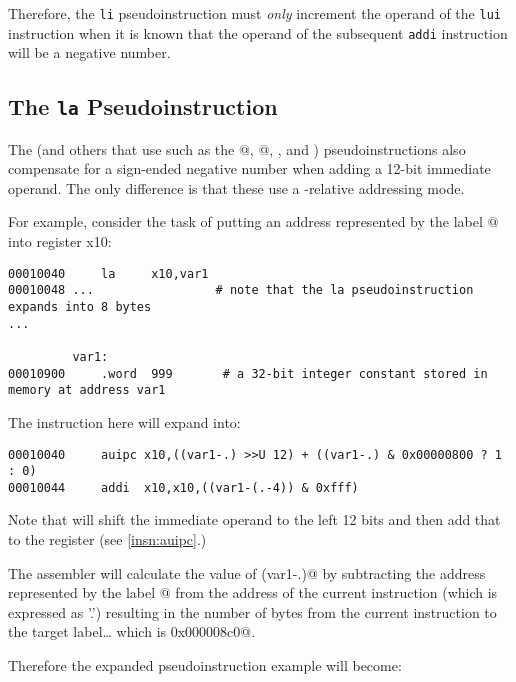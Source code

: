 Therefore, the {\tt li} pseudoinstruction must {\em only} increment the operand of the
{\tt lui} instruction when it is known that the operand of the subsequent {\tt addi} 
instruction will be a negative number.









\subsection{The {\tt la} Pseudoinstruction}

The \verb@la@ (and others that use \verb@auipc@ such as 
the @, @, \verb@call@, and \verb@tail@) pseudoinstructions
also compensate for a sign-ended negative number when adding a 12-bit immediate
operand. The only difference is that these use a \verb@pc@-relative addressing mode.

For example, consider the task of putting an address represented by the label @
into register x10:

{\small
\begin{verbatim}
00010040     la     x10,var1
00010048 ...                 # note that the la pseudoinstruction expands into 8 bytes
...

         var1:
00010900     .word  999       # a 32-bit integer constant stored in memory at address var1
\end{verbatim}
}
The \verb@la@ instruction here will expand into:
{\small
\begin{verbatim}
00010040     auipc x10,((var1-.) >>U 12) + ((var1-.) & 0x00000800 ? 1 : 0)
00010044     addi  x10,x10,((var1-(.-4)) & 0xfff)
\end{verbatim}
}

Note that \verb@auipc@ will shift the immediate operand to the left 12 bits and then
add that to the \verb@pc@ register (see \autoref{insn:auipc}.)

The assembler will calculate the value of \verb@(var1-.)@ by subtracting the address
represented by the label @ from the address of the current instruction 
(which is expressed as '.') resulting in the number of bytes from the current instruction
to the target label\ldots{} which is \verb@0x000008c0@.

Therefore the expanded pseudoinstruction example will become:
 
